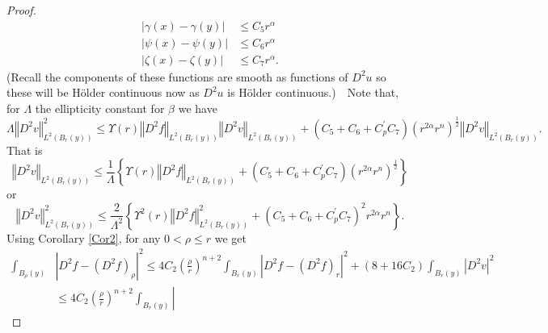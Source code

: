 \documentclass[12pt,leqno]{amsart}%
\theoremstyle{plain}
\numberwithin{equation}{section}
\theoremstyle{definition}
\begin{document}
\begin{proof}
\begin{comment}
\begin{align*}
\int_{B_{1/2}} \left| [\zeta(x)-\zeta(0)] v^{-h_{p}}\right|  dx  &
\leq\left\Vert \zeta(x)-\zeta(0)\right\Vert _{L^{2n/(n+2)}(B_{r})}\left\Vert
Dv\right\Vert _{L^{2n/(n-2)}(B_{r})}\\
&  \leq C_{7}r^{\frac{n+2+2\alpha}{2}}\left\Vert Dv\right\Vert _{L^{2n/(n-2)}%
(B_{r})}\\
&  \leq C_{s}\left(  C_{7}r^{2}r^{2\alpha}r^{n}\right)  ^{1/2}C_{s}\left\Vert
D^{2}v\right\Vert _{L^{2}(B_{r})}%
\end{align*}
\end{comment}
%

\begin{align*}
\left\vert \gamma(x)-\gamma(y)\right\vert  &  \leq C_{5}r^{\alpha}\\
\left\vert \psi(x)-\psi(y)\right\vert  &  \leq C_{6}r^{\alpha}\\
\left\vert \zeta(x)-\zeta(y)\right\vert  &  \leq C_{7}r^{\alpha}.
\end{align*}
(Recall the components of these functions are smooth as functions of $D^{2}u$
so these will be H\"{o}lder continuous now as $D^{2}u$ is H\"{o}lder
continuous.)\ \ Note that, for $\Lambda$ the ellipticity constant for $\beta$
we have
\[
\Lambda\left\Vert D^{2}v\right\Vert _{L^{2}(B_{r}(y))}^{2}\leq\Upsilon
(r)\left\Vert D^{2}f\right\Vert _{L^{2}(B_{r}(y))}\left\Vert D^{2}v\right\Vert
_{L^{2}(B_{r}(y))}+(C_{5}+C_{6}+C_{p}^{\prime}C_{7})\left(  r^{2\alpha}%
r^{n}\right)^{\frac{1}{2}}\left\Vert D^{2}v\right\Vert _{L^{2}(B_{r}(y))}.
\]
That is
\[
\left\Vert D^{2}v\right\Vert _{L^{2}(B_{r}(y))}\leq\frac{1}{\Lambda}\left\{
\Upsilon(r)\left\Vert D^{2}f\right\Vert _{L^{2}(B_{r}(y))}+(C_{5}+C_{6}%
+C_{p}^{\prime}C_{7})\left(  r^{2\alpha}r^{n}\right)  ^{\frac{1}{2}}\right\}
\]
or%
\[
\left\Vert D^{2}v\right\Vert _{L^{2}(B_{r}(y))}^{2}\leq\frac{2}{\Lambda^{2}%
}\left\{  \Upsilon^{2}(r)\left\Vert D^{2}f\right\Vert _{L^{2}(B_{r}(y))}%
^{2}+(C_{5}+C_{6}+C_{p}^{\prime}C_{7})^{2}r^{2\alpha}r^{n}\right\}  .
\]
Using Corollary \ref{Cor2}, for any $0<\rho\leq r$ we get
\begin{align}
\int_{B_{\rho}(y)}  &  \left\vert D^{2}f-(D^{2}f)_{\rho}\right\vert ^{2}%
\leq4C_{2}\left(  \frac{\rho}{r}\right)  ^{n+2}\int_{B_{r}(y)}\left\vert
D^{2}f-(D^{2}f)_{r}\right\vert ^{2}+\left(  8+16C_{2}\right)  \int_{B_{r}%
(y)}\left\vert D^{2}v\right\vert ^{2}\nonumber\\
&  \leq4C_{2}\left(  \frac{\rho}{r}\right)  ^{n+2}\int_{B_{r}(y)}\left\vert

\end{align}
\end{proof}
\end{document}
